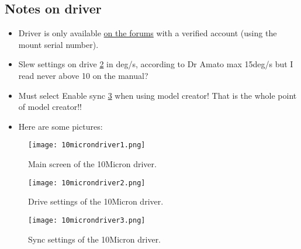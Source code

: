 \documentclass[../main.tex]{subfiles}
\begin{document}
\subsection{Notes on driver}
\begin{itemize}
    \item Driver is only available \href{https://www.10micron.com/forum/viewtopic.php?f=3&t=1907}{on the forums} with a verified account (using the mount serial number).
    \item Slew settings on drive \cref{fig:10microndriver_drive} in deg/s, according to Dr Amato max 15deg/s but I read never above 10 on the manual?
    \item Must select Enable sync \cref{fig:10microndriver_sync} when using model creator! That is the whole point of model creator!!
    \item Here are some pictures:
\end{itemize}
\begin{figure}[h]
    \centering
    \texttt{[image: 10microndriver1.png]}
    \caption{Main screen of the 10Micron driver.}
    \label{fig:10microndriver1}
\end{figure}
\begin{figure}[h]
    \centering
    \texttt{[image: 10microndriver2.png]}
    \caption{Drive settings of the 10Micron driver.}
    \label{fig:10microndriver_drive}
\end{figure}
\begin{figure}[h]
    \centering
    \texttt{[image: 10microndriver3.png]}
    \caption{Sync settings of the 10Micron driver.}
    \label{fig:10microndriver_sync}
\end{figure}
\end{document}

